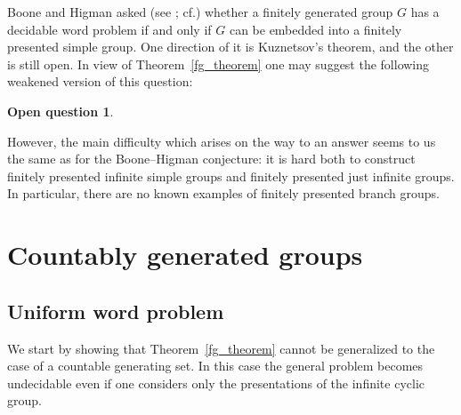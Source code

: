 \documentclass[12pt,a4paper]{amsart}
\newtheorem*{oc*}{Open question}
\begin{document}
Boone and Higman asked (see \cite{BooneHigman1974}; cf.\cite{BBMZ2025}) whether a finitely generated group $G$ has a decidable word problem if and only if $G$ can be embedded into a finitely presented simple group. One direction of it is Kuznetsov's theorem, and the other is still open. In view of Theorem~\ref{fg_theorem} one may suggest the following weakened version of this question: 
\begin{oc*}
\end{oc*}
However, the main difficulty which arises on the way to an answer seems to us the same as for the Boone--Higman conjecture: it is hard both to construct finitely presented infinite simple groups and finitely presented just infinite groups. In particular, there are no known examples of finitely presented branch groups.

\section{Countably generated groups}
\label{sec-cgg}

\subsection{Uniform word problem}
We start by showing that Theorem~\ref{fg_theorem} cannot be generalized to the case of a countable generating set. In this case the general problem becomes undecidable even if one considers only the presentations of the infinite cyclic group.
\end{document}
